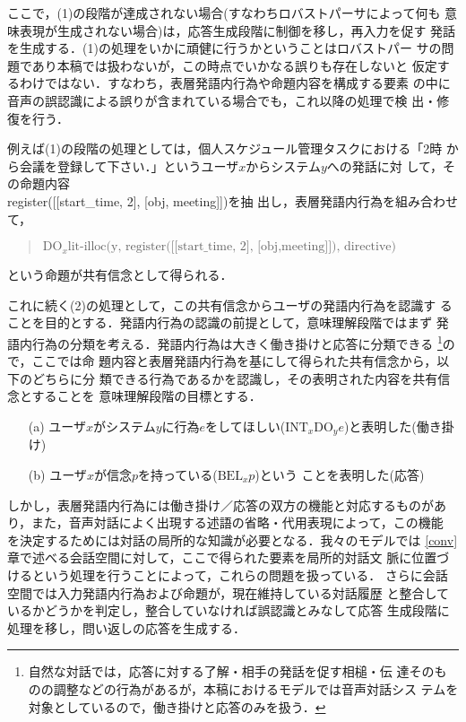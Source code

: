 ここで，(1)の段階が達成されない場合(すなわちロバストパーサによって何も
意味表現が生成されない場合)は，応答生成段階に制御を移し，再入力を促す
発話を生成する．(1)の処理をいかに頑健に行うかということはロバストパー
サの問題であり本稿では扱わないが，この時点でいかなる誤りも存在しないと
仮定するわけではない．すなわち，表層発語内行為や命題内容を構成する要素
の中に音声の誤認識による誤りが含まれている場合でも，これ以降の処理で検
出・修復を行う．

例えば(1)の段階の処理としては，個人スケジュール管理タスクにおける「2時
から会議を登録して下さい．」というユーザ$x$からシステム$y$への発話に対
して，その命題内容\\ register([[start\_time, 2], [obj, meeting]])を抽
出し，表層発語内行為を組み合わせて，
\begin{quote}
$\mbox{DO}_x \mbox{lit-illoc(y, register([[start\_time,
2], [obj,meeting]]), directive)}$
\end{quote}
という命題が共有信念として得られる．

これに続く(2)の処理として，この共有信念からユーザの発語内行為を認識す
ることを目的とする．発語内行為の認識の前提として，意味理解段階ではまず
発語内行為の分類を考える．発語内行為は大きく働き掛けと応答に分類できる
\footnote {自然な対話では，応答に対する了解・相手の発話を促す相槌・伝
達そのものの調整などの行為があるが，本稿におけるモデルでは音声対話シス
テムを対象としているので，働き掛けと応答のみを扱う．}ので，ここでは命
題内容と表層発語内行為を基にして得られた共有信念から，以下のどちらに分
類できる行為であるかを認識し，その表明された内容を共有信念とすることを
意味理解段階の目標とする．

\begin{enumerate}
\item[(a)] ユーザ$x$がシステム$y$に行為$e$をしてほしい($\mbox{INT}_x
\mbox{DO}_y e $)と表明した(働き掛け)
\item[(b)] ユーザ$x$が信念$p$を持っている($\mbox{BEL}_x p$)という
ことを表明した(応答)
\end{enumerate}

しかし，表層発語内行為には働き掛け／応答の双方の機能と対応するものがあ
り，また，音声対話によく出現する述語の省略・代用表現によって，この機能
を決定するためには対話の局所的な知識が必要となる．我々のモデルでは
\ref{conv}章で述べる会話空間に対して，ここで得られた要素を局所的対話文
脈に位置づけるという処理を行うことによって，これらの問題を扱っている．
さらに会話空間では入力発語内行為および命題が，現在維持している対話履歴
と整合しているかどうかを判定し，整合していなければ誤認識とみなして応答
生成段階に処理を移し，問い返しの応答を生成する．

